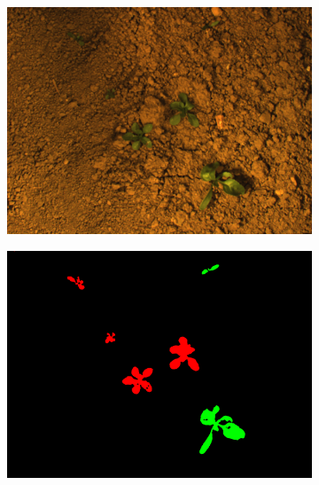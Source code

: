 \begin{figure}
\begin{subfigure}[b]{0.49\linewidth}
    \includegraphics[width=\linewidth]{pics/stuttgart/images/masks_8mm_fromImages_frame479.png}
   		\caption{}
		\label{stuttgart_img}    		
   \end{subfigure}
        \begin{subfigure}[b]{0.49\linewidth}
    \includegraphics[width=\linewidth]{pics/stuttgart/annotations/masks_8mm_fromImages_frame479_GroundTruth_iMap.png}
   		\caption{}
		\label{stuttgart_lbl}    		
   \end{subfigure}
        \begin{subfigure}[b]{0.49\linewidth}

\end{subfigure}
\end{figure}
